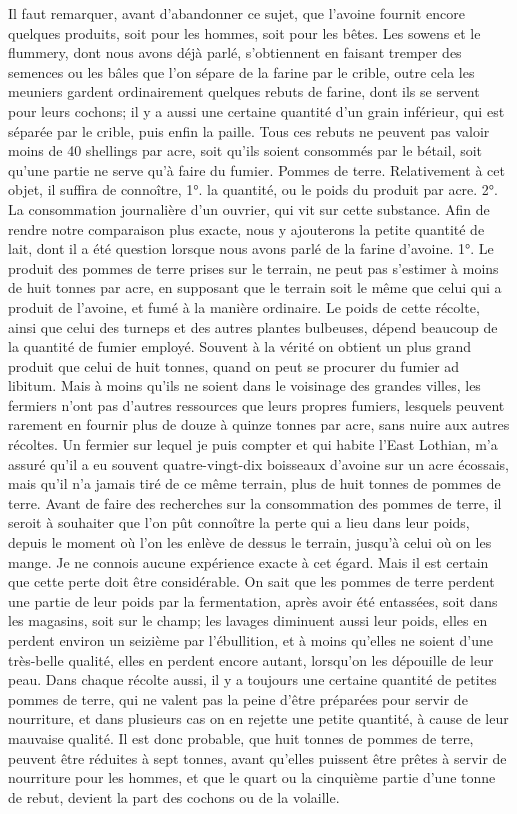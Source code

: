Il faut remarquer, avant d'abandonner ce sujet, que l'avoine fournit encore quelques produits, soit pour les hommes, soit pour les bêtes. Les sowens et le flummery, dont nous avons déjà parlé, s'obtiennent en faisant tremper des semences ou les bâles que l'on sépare de la farine par le crible, outre cela\setcounter{page}{357} les meuniers gardent ordinairement quelques rebuts de farine, dont ils se servent pour leurs cochons; il y a aussi une certaine quantité d'un grain inférieur, qui est séparée par le crible, puis enfin la paille. Tous ces rebuts ne peuvent pas valoir moins de 40 shellings par acre, soit qu'ils soient consommés par le bétail, soit qu'une partie ne serve qu'à faire du fumier.
Pommes de terre. Relativement à cet objet, il suffira de connoître, 1°. la quantité, ou le poids du produit par acre. 2°. La consommation journalière d'un ouvrier, qui vit sur cette substance. Afin de rendre notre comparaison plus exacte, nous y ajouterons la petite quantité de lait, dont il a été question lorsque nous avons parlé de la farine d'avoine.
1°. Le produit des pommes de terre prises sur le terrain, ne peut pas s'estimer à moins de huit tonnes par acre, en supposant que le terrain soit le même que celui qui a produit de l'avoine, et fumé à la manière ordinaire. Le poids de cette récolte, ainsi que celui des turneps et des autres plantes bulbeuses, dépend beaucoup de la quantité de fumier employé. Souvent à la vérité on obtient un plus grand produit que celui de huit tonnes, quand on peut se procurer du fumier\setcounter{page}{358} ad libitum. Mais à moins qu'ils ne soient dans le voisinage des grandes villes, les fermiers n'ont pas d'autres ressources que leurs propres fumiers, lesquels peuvent rarement en fournir plus de douze à quinze tonnes par acre, sans nuire aux autres récoltes. Un fermier sur lequel je puis compter et qui habite l'East Lothian, m'a assuré qu'il a eu souvent quatre-vingt-dix boisseaux d'avoine sur un acre écossais, mais qu'il n'a jamais tiré de ce même terrain, plus de huit tonnes de pommes de terre.
Avant de faire des recherches sur la consommation des pommes de terre, il seroit à souhaiter que l'on pût connoître la perte qui a lieu dans leur poids, depuis le moment où l'on les enlève de dessus le terrain, jusqu'à celui où on les mange. Je ne connois aucune expérience exacte à cet égard. Mais il est certain que cette perte doit être considérable. On sait que les pommes de terre perdent une partie de leur poids par la fermentation, après avoir été entassées, soit dans les magasins, soit sur le champ; les lavages diminuent aussi leur poids, elles en perdent environ un seizième par l'ébullition, et à moins qu'elles ne soient d'une très-belle qualité, elles en perdent encore autant, lorsqu'on les dépouille de leur peau. Dans chaque récolte aussi, il y a toujours une certaine quantité\setcounter{page}{359} de petites pommes de terre, qui ne valent pas la peine d'être préparées pour servir de nourriture, et dans plusieurs cas on en rejette une petite quantité, à cause de leur mauvaise qualité. Il est donc probable, que huit tonnes de pommes de terre, peuvent être réduites à sept tonnes, avant qu'elles puissent être prêtes à servir de nourriture pour les hommes, et que le quart ou la cinquième partie d'une tonne de rebut, devient la part des cochons ou de la volaille.
